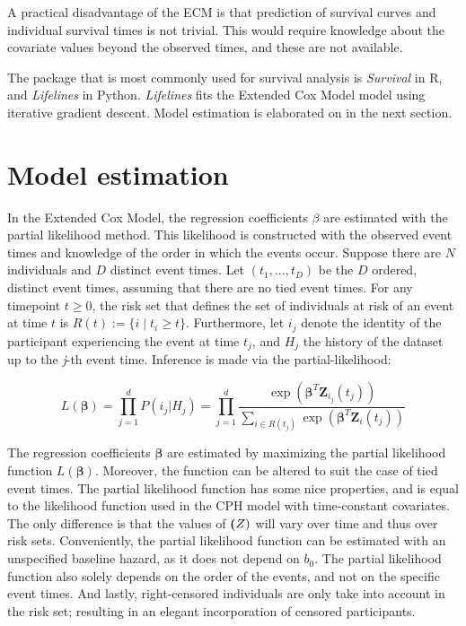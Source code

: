 A practical disadvantage of the ECM is that prediction of survival curves and individual survival times is not trivial. This would require knowledge about the covariate values beyond the observed times, and these are not available. 

The package that is most commonly used for survival analysis is \textit{Survival} in R, and \textit{Lifelines} in Python. \textit{Lifelines} fits the Extended Cox Model model using iterative gradient descent. Model estimation is elaborated on in the next section. 


\section{Model estimation}
\label{section:methodology:model_estimation}
In the Extended Cox Model, the regression coefficients $\beta$ are estimated with the partial likelihood method. This likelihood is constructed with the observed event times and knowledge of the order in which the events occur. Suppose there are $N$ individuals and $D$ distinct event times. Let $(t_1, ..., t_D)$ be the $D$ ordered, distinct event times, assuming that there are no tied event times. For any timepoint $t \geq 0$, the risk set that defines the set of individuals at risk of an event at time $t$ is $R(t) := \{i \mid t_i \geq t\}$. Furthermore, let $i_j$ denote the identity of the participant experiencing the event at time $t_j$, and $H_j$ the history of the dataset up to the \textit{j}-th event time. Inference is made via the partial-likelihood: 

$$L(\boldsymbol{\beta}) = \prod_{j=1}^{d}P(i_j | H_j) = \prod_{j=1}^{d} \frac{\exp(\boldsymbol{\beta}^T \mathbf{Z}_{i_j}(t_j))}{\sum_{i \in R(t_j)} \exp(\boldsymbol{\beta}^T \mathbf{Z}_{i}(t_j))}$$

The regression coefficients $\boldsymbol{\beta}$ are estimated by maximizing the partial likelihood function $L(\boldsymbol{\beta})$. Moreover, the function can be altered to suit the case of tied event times. The partial likelihood function has some nice properties, and is equal to the likelihood function used in the CPH model with time-constant covariates. The only difference is that the values of $\textbf(Z)$ will vary over time and thus over risk sets. Conveniently, the partial likelihood function can be estimated with an unspecified baseline hazard, as it does not depend on $b_0$. The partial likelihood function also solely depends on the order of the events, and not on the specific event times. And lastly, right-censored individuals are only take into account in the risk set; resulting in an elegant incorporation of censored participants. 

